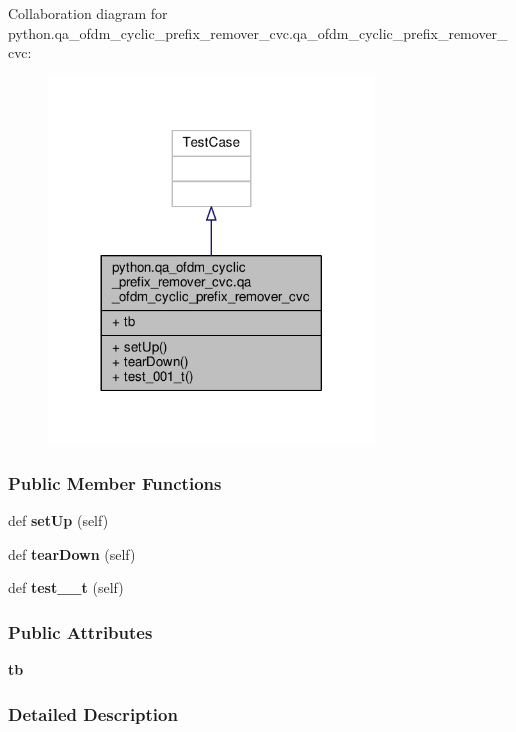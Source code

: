 Collaboration diagram for python.\+qa\+\_\+ofdm\+\_\+cyclic\+\_\+prefix\+\_\+remover\+\_\+cvc.\+qa\+\_\+ofdm\+\_\+cyclic\+\_\+prefix\+\_\+remover\+\_\+cvc\+:
\nopagebreak
\begin{figure}[H]
\begin{center}
\leavevmode
\includegraphics[width=245pt]{db/d55/classpython_1_1qa__ofdm__cyclic__prefix__remover__cvc_1_1qa__ofdm__cyclic__prefix__remover__cvc__coll__graph}
\end{center}
\end{figure}
\subsubsection*{Public Member Functions}
\begin{DoxyCompactItemize}
\item 
def {\bf set\+Up} (self)
\item 
def {\bf tear\+Down} (self)
\item 
def {\bf test\+\_\+\_\+t} (self)
\end{DoxyCompactItemize}
\subsubsection*{Public Attributes}
\begin{DoxyCompactItemize}
\item 
{\bf tb}
\end{DoxyCompactItemize}


\subsubsection{Detailed Description}


